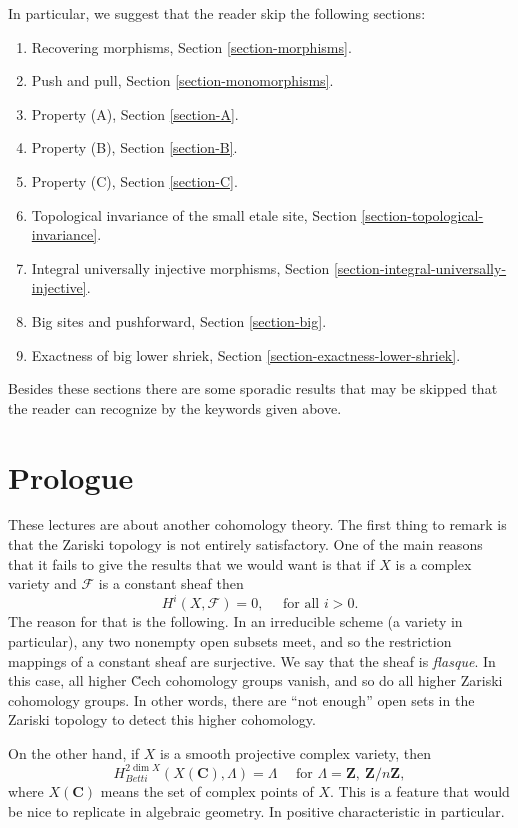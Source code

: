 \medskip\noindent
In particular, we suggest that the reader skip the following sections:
\begin{enumerate}
\item Recovering morphisms,
Section \ref{section-morphisms}.
\item Push and pull,
Section \ref{section-monomorphisms}.
\item Property (A),
Section \ref{section-A}.
\item Property (B),
Section \ref{section-B}.
\item Property (C),
Section \ref{section-C}.
\item Topological invariance of the small etale site,
Section \ref{section-topological-invariance}.
\item Integral universally injective morphisms,
Section \ref{section-integral-universally-injective}.
\item Big sites and pushforward,
Section \ref{section-big}.
\item Exactness of big lower shriek,
Section \ref{section-exactness-lower-shriek}.
\end{enumerate}
Besides these sections there are some sporadic results that may be skipped
that the reader can recognize by the keywords given above.



\section{Prologue}
\label{section-prologue}

\noindent
These lectures are about another cohomology theory. The first thing to remark
is that the Zariski topology is not entirely satisfactory. One of the main
reasons that it fails to give the results that we would want is that if $X$ is
a complex variety and $\mathcal{F}$ is a constant sheaf then
$$
H^i(X, \mathcal{F}) = 0, \quad \text{ for all } i > 0.
$$
The reason for that is the following. In an irreducible scheme (a variety in
particular), any two nonempty open subsets meet, and so the restriction
mappings of a constant sheaf are surjective. We say that the sheaf is
{\it flasque}. In this case, all higher \u Cech cohomology groups vanish, and
so do all higher Zariski cohomology groups. In other words, there are ``not
enough'' open sets in the Zariski topology to detect this higher cohomology.

\medskip\noindent
On the other hand, if $X$ is a smooth projective complex variety, then
$$
H_{Betti}^{2 \dim X}(X (\mathbf{C}), \Lambda) = \Lambda \quad \text{ for }
\Lambda = \mathbf{Z}, \ \mathbf{Z}/n\mathbf{Z},
$$
where $X(\mathbf{C})$ means the set of complex points of $X$. This is a feature
that would be nice to replicate in algebraic geometry. In positive
characteristic in particular.




